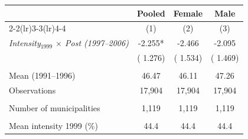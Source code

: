 \begin{tabular}{lccc} \hline \hline
& Pooled & Female & Male \\ \cmidrule(lr){2-2}\cmidrule(lr){3-3}\cmidrule(lr){4-4}
& \multicolumn{1}{c}{(1)} & \multicolumn{1}{c}{(2)} & \multicolumn{1}{c}{(3)} \\ \toprule
\textit{Intensity$_{1999}$ $\times$ Post (1997--2006)} &       -2.255* &       -2.466 &       -2.095 \\ 
 & (       1.276) & (       1.534) & (       1.469) \\ 
  & & & \\ 
Mean (1991--1996) &        46.47 &        46.11 &        47.26 \\ 
Observations &       17,904 &       17,904 &       17,904 \\ 
  & & & \\ 
Number of municipalities &        1,119 &        1,119 &        1,119 \\ 
  & & & \\ 
Mean intensity 1999 (\%) &   44.4 &   44.4 &   44.4 \\ 
\bottomrule
\end{tabular}